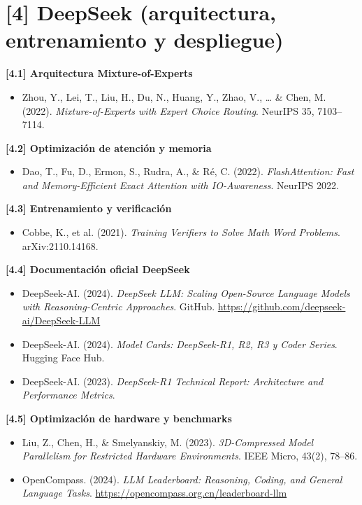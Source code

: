 \documentclass[12pt,a4paper]{report}
\numberwithin{figure}{section}
\begin{document}
\section*{[4] DeepSeek (arquitectura, entrenamiento y despliegue)}
\label{ref:4}

\textbf{[4.1] Arquitectura Mixture-of-Experts}
\label{ref:4.1}
\begin{itemize}
  \item Zhou, Y., Lei, T., Liu, H., Du, N., Huang, Y., Zhao, V., \ldots{} \& Chen, M. (2022). \textit{Mixture-of-Experts with Expert Choice Routing}. NeurIPS 35, 7103–7114.
\end{itemize}

\textbf{[4.2] Optimización de atención y memoria}
\label{ref:4.2}
\begin{itemize}
  \item Dao, T., Fu, D., Ermon, S., Rudra, A., \& Ré, C. (2022). \textit{FlashAttention: Fast and Memory-Efficient Exact Attention with IO-Awareness}. NeurIPS 2022.
\end{itemize}

\textbf{[4.3] Entrenamiento y verificación}
\label{ref:4.3}
\begin{itemize}
  \item Cobbe, K., et al. (2021). \textit{Training Verifiers to Solve Math Word Problems}. arXiv:2110.14168.
\end{itemize}

\textbf{[4.4] Documentación oficial DeepSeek}
\label{ref:4.4}
\begin{itemize}
  \item DeepSeek-AI. (2024). \textit{DeepSeek LLM: Scaling Open-Source Language Models with Reasoning-Centric Approaches}. GitHub. \url{https://github.com/deepseek-ai/DeepSeek-LLM}
  \item DeepSeek-AI. (2024). \textit{Model Cards: DeepSeek-R1, R2, R3 y Coder Series}. Hugging Face Hub.
  \item DeepSeek-AI. (2023). \textit{DeepSeek-R1 Technical Report: Architecture and Performance Metrics}.
\end{itemize}

\textbf{[4.5] Optimización de hardware y benchmarks}
\label{ref:4.5}
\begin{itemize}
  \item Liu, Z., Chen, H., \& Smelyanskiy, M. (2023). \textit{3D-Compressed Model Parallelism for Restricted Hardware Environments}. IEEE Micro, 43(2), 78–86.
  \item OpenCompass. (2024). \textit{LLM Leaderboard: Reasoning, Coding, and General Language Tasks}. \url{https://opencompass.org.cn/leaderboard-llm}
\end{itemize}
\end{document}
